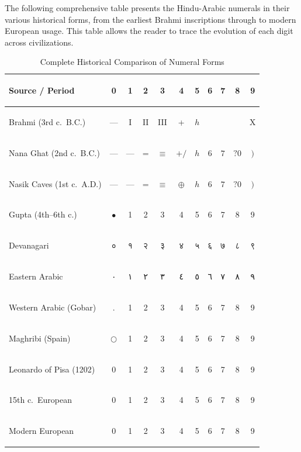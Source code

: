 \documentclass[11pt,a4paper]{article}
\newcommand{\ar}[1]{{\arabicfont #1}}
\begin{document}
The following comprehensive table presents the Hindu-Arabic numerals in their various historical forms, from the earliest Brahmi inscriptions through to modern European usage. This table allows the reader to trace the evolution of each digit across civilizations.

\begin{table}[H]
\centering
\caption{Complete Historical Comparison of Numeral Forms}
\label{tab:complete-comparison}
\footnotesize
\begin{tabularx}{\textwidth}{>{\bfseries\raggedright\arraybackslash}X | c c c c c c c c c c}
\toprule
\textbf{Source / Period} & \textbf{0} & \textbf{1} & \textbf{2} & \textbf{3} & \textbf{4} & \textbf{5} & \textbf{6} & \textbf{7} & \textbf{8} & \textbf{9} \\
\midrule
\rowcolor{tableodd}
Brahmi (3rd c.~B.C.) & --- & I & II & III & + & $h$ & & & & X \\
\rowcolor{tableeven}
Nana Ghat (2nd c.~B.C.) & --- & --- & = & $\equiv$ & $+/$ & $h$ & $6$ & $7$ & $?0$ & $)$ \\
\rowcolor{tableodd}
Nasik Caves (1st c.~A.D.) & --- & --- & = & $\equiv$ & $\oplus$ & $h$ & $6$ & $7$ & $?0$ & $)$ \\
\rowcolor{tableeven}
Gupta (4th--6th c.) & $\bullet$ & 1 & 2 & 3 & 4 & 5 & 6 & 7 & 8 & 9 \\
\rowcolor{tableodd}
Devanagari & {\devanagarifont ०} & {\devanagarifont १} & {\devanagarifont २} & {\devanagarifont ३} & {\devanagarifont ४} & {\devanagarifont ५} & {\devanagarifont ६} & {\devanagarifont ७} & {\devanagarifont ८} & {\devanagarifont ९} \\
\midrule
\rowcolor{tableeven}
Eastern Arabic & \ar{٠} & \ar{١} & \ar{٢} & \ar{٣} & \ar{٤} & \ar{٥} & \ar{٦} & \ar{٧} & \ar{٨} & \ar{٩} \\
\rowcolor{tableodd}
Western Arabic (Gobar) & . & 1 & 2 & 3 & 4 & 5 & 6 & 7 & 8 & 9 \\
\rowcolor{tableeven}
Maghribi (Spain) & $\bigcirc$ & 1 & 2 & 3 & 4 & 5 & 6 & 7 & 8 & 9 \\
\midrule
\rowcolor{tableodd}
Leonardo of Pisa (1202) & 0 & 1 & 2 & 3 & 4 & 5 & 6 & 7 & 8 & 9 \\
\rowcolor{tableeven}
15th c.~European & 0 & 1 & 2 & 3 & 4 & 5 & 6 & 7 & 8 & 9 \\
\rowcolor{tableodd}
Modern European & 0 & 1 & 2 & 3 & 4 & 5 & 6 & 7 & 8 & 9 \\
\bottomrule
\end{tabularx}
\end{table}
\end{document}
